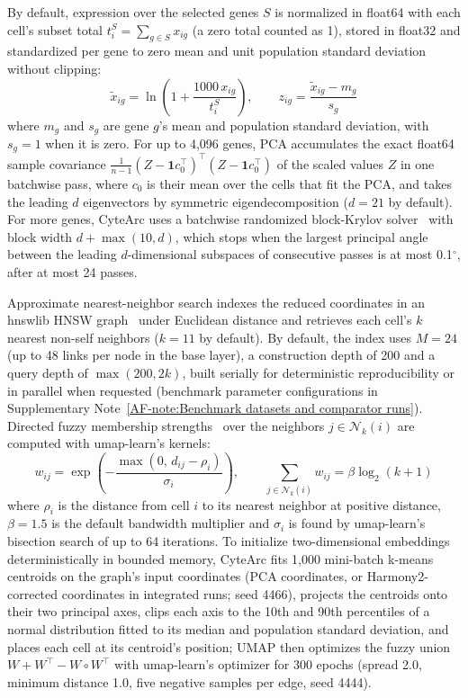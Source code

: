 \documentclass[11pt]{article}
\newcommand{\sref}[1]{\ref*{AF-#1}}
\begin{document}
By default, expression over the selected genes $S$ is normalized in float64 with each cell's subset total $t_i^{S}=\sum_{g\in S}x_{ig}$ (a zero total counted as 1), stored in float32 and standardized per gene to zero mean and unit population standard deviation without clipping:
\[
\tilde x_{ig}=\ln\left(1+\frac{1000\,x_{ig}}{t_i^{S}}\right),\qquad z_{ig}=\frac{\tilde x_{ig}-m_g}{s_g}
\]
where $m_g$ and $s_g$ are gene $g$'s mean and population standard deviation, with $s_g=1$ when it is zero. For up to 4,096 genes, PCA accumulates the exact float64 sample covariance $\frac{1}{n-1}(Z-\mathbf{1}c_0^{\top})^{\top}(Z-\mathbf{1}c_0^{\top})$ of the scaled values $Z$ in one batchwise pass, where $c_0$ is their mean over the cells that fit the PCA, and takes the leading $d$ eigenvectors by symmetric eigendecomposition ($d=21$ by default). For more genes, CyteArc uses a batchwise randomized block-Krylov solver~\cite{halko2011finding,musco2015randomized} with block width $d+\max(10,d)$, which stops when the largest principal angle between the leading $d$-dimensional subspaces of consecutive passes is at most 0.1\ensuremath{^{\circ}}, after at most 24 passes.

Approximate nearest-neighbor search indexes the reduced coordinates in an hnswlib HNSW graph~\cite{malkov2020} under Euclidean distance and retrieves each cell's $k$ nearest non-self neighbors ($k=11$ by default). By default, the index uses $M=24$ (up to 48 links per node in the base layer), a construction depth of 200 and a query depth of $\max(200,2k)$, built serially for deterministic reproducibility or in parallel when requested (benchmark parameter configurations in Supplementary Note~\sref{note:Benchmark datasets and comparator runs}). Directed fuzzy membership strengths~\cite{mcinnes2018umap} over the neighbors $j\in\mathcal{N}_k(i)$ are computed with umap-learn's kernels:
\[
w_{ij}=\exp\left(-\frac{\max\left(0,\,d_{ij}-\rho_i\right)}{\sigma_i}\right),\qquad \sum_{j\in\mathcal{N}_k(i)}w_{ij}=\beta\log_{2}(k+1)
\]
where $\rho_i$ is the distance from cell $i$ to its nearest neighbor at positive distance, $\beta=1.5$ is the default bandwidth multiplier and $\sigma_i$ is found by umap-learn's bisection search of up to 64 iterations. To initialize two-dimensional embeddings deterministically in bounded memory, CyteArc fits 1,000 mini-batch k-means centroids on the graph's input coordinates (PCA coordinates, or Harmony2-corrected coordinates in integrated runs; seed 4466), projects the centroids onto their two principal axes, clips each axis to the 10th and 90th percentiles of a normal distribution fitted to its median and population standard deviation, and places each cell at its centroid's position; UMAP then optimizes the fuzzy union $W+W^{\top}-W\circ W^{\top}$ with umap-learn's optimizer for 300 epochs (spread 2.0, minimum distance 1.0, five negative samples per edge, seed 4444).
\end{document}
